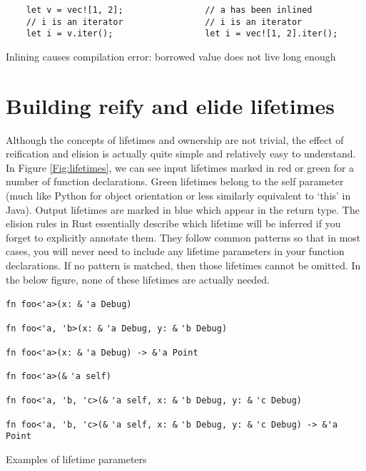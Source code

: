 \begin{fig}[H]
\begin{verbatim}
    let v = vec![1, 2];                // a has been inlined
    // i is an iterator                // i is an iterator     
    let i = v.iter();                  let i = vec![1, 2].iter();
\end{verbatim}
\caption{Inlining causes compilation error: borrowed value does not live long enough}
\label{Fig:inlinefail}
\end{fig}

\section{Building reify and elide lifetimes}\label{S:buildreielide}
Although the concepts of lifetimes and ownership are not trivial, the effect of reification and elision is actually quite simple and relatively easy to understand. In Figure \ref{Fig:lifetimes}, we can see input lifetimes marked in red or green for a number of function declarations. Green lifetimes belong to the self parameter (much like Python for object orientation or less similarly equivalent to `this' in Java). Output lifetimes are marked in blue which appear in the return type. The elision rules in Rust essentially describe which lifetime will be inferred if you forget to explicitly annotate them. They follow common patterns so that in most cases, you will never need to include any lifetime parameters in your function declarations. If no pattern is matched, then those lifetimes cannot be omitted. In the below figure, none of these lifetimes are actually needed.

\begin{fig}
{\verb|fn foo<'a>(x: &|}
{\color{red} \verb|'a|}{\verb| Debug)|}

{\verb|fn foo<'a, 'b>(x: &|}
{\color{red} \verb|'a|}{\verb| Debug, y: &|}{\color{red} \verb|'b|}{\verb| Debug)|}

{\verb|fn foo<'a>(x: &|}
{\color{red} \verb|'a|}{\verb| Debug) -> &|}{\color{blue}\verb|'a|}{\verb| Point|}

{\verb|fn foo<'a>(&|}
{\color{green} \verb|'a|}{\verb| self)|}

{\verb|fn foo<'a, 'b, 'c>(&|}
{\color{green} \verb|'a|}{\verb| self, x: &|}{\color{red} \verb|'b|}{\verb| Debug, y: &|}
{\color{red} \verb|'c|}{\verb| Debug)|}

{\verb|fn foo<'a, 'b, 'c>(&|}
{\color{green} \verb|'a|}{\verb| self, x: &|}{\color{red} \verb|'b|}{\verb| Debug, y: &|}
{\color{red}\verb|'c|}{\verb| Debug) -> &|}{\color{blue}\verb|'a|}{\verb| Point|}

\caption{Examples of lifetime parameters}
\label{Fig:lifetimes}
\end{fig}

